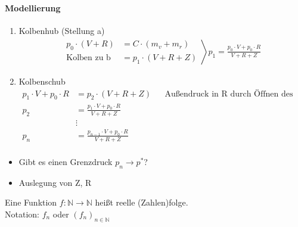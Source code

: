 \begin{example}[Evakuierungspumpe]
\paragraph{Modellierung}
\begin{enumerate}
	\item Kolbenhub (Stellung a)
	\begin{align*} \left.
		\begin{aligned}
			p_0 \cdot (V + R) &= C \cdot (m_v + m_r) \\
			\text{Kolben zu b} &= p_1 \cdot (V + R + Z)
		\end{aligned} \right\rangle
		p_1 = \frac{p_0 \cdot V + p_0 \cdot R}{V + R + Z}
	\end{align*}
	\item Kolbenschub
	\begin{align*}
	p_1 \cdot V + p_0 \cdot R &= p_2 \cdot (V + R + Z) && \text{Außendruck in R durch Öffnen des Ventils 1} \\
	p_2 &= \frac{p_1 \cdot V + p_0 \cdot R}{V + R + Z} \\
	&\vdots \\
	p_n &= \frac{p_{n-1} \cdot V + p_0 \cdot R}{V + R + Z} \\
	\end{align*}
\end{enumerate}
\begin{itemize} 
  \item Gibt es einen Grenzdruck $p_n \rightarrow p^*$?
  \item Auslegung von Z, R
\end{itemize}

\end{example}

\begin{definition}[Zahlenfolge]
Eine Funktion $f: \mathbb N \rightarrow \mathbb N$ heißt reelle (Zahlen)folge.\\
Notation: $f_n$ oder $(f_n)_{n \in \mathbb N}$
\end{definition}

